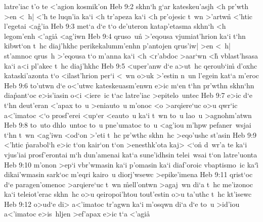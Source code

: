 latre'iac
t'o
te
<'agion
kosmik'on\bibvsend
\vs Heb 9:2
skhn`h
g`ar
kateskeu'asjh
<h
pr'wth
>en
<~h|
<'h
te
luqn'ia
ka`i
<h
tr'apeza
ka`i
<h
pr'ojesic
t~wn
>'artw\r{n}
<'htic
l'egetai
<a\r{g}'ia\bibvsend
{}
\vs Heb 9:3
met`a
d`e
t`o
de'uteron
katap'etasma
skhn`h
<h
legom'enh
<'agia\r{}
<ag'iwn\bibvsend
\vs Heb 9:4
qruso~un\r{}
>'eqousa
vjumiat'hrion
ka`i
t`hn
kibwt`on
t~hc
diaj'hkhc
perikekalumm'enhn
p'antojen
qrus'iw|
>en
<~h|
st'amnoc
qrus~h
>'eqousa
t`o
m'anna
ka`i
<h
<r'abdoc
>aar`wn
<h\r{}
vblast'hsasa
ka`i
a<i
pl'akec
t~hc
diaj'hkhc\bibvsend
\vs Heb 9:5
<uper'anw
d`e
a>ut~hc
qeroub`i\r{m}
d'oxhc
kataski'azonta
t`o
<ilast'hrion
per`i
<~wn
o>uk
>'estin
n~un
l'egein
kat`a
m'eroc\bibvsend
\vs Heb 9:6
to'utwn
d`e
o<'utwc
kateskeuasm'enwn
e>ic
m`en
t`hn
pr'wthn
skhn`hn
dia\r{p}ant`oc
e>is'iasin
o<i
<iere~ic
t`ac
latre'iac
>epitelo~untec\bibvsend
\vs Heb 9:7
e>ic
d`e
t`hn
deut'eran
<'apax
to~u
>eniauto~u
m'onoc
<o
>arqiere`uc
o>u
qwr`ic
a<'imatoc
<`o
prosf'erei
<up`er
<eauto~u
ka`i
t~wn
to~u
lao~u
>agnohm'atwn\bibvsend
\vs Heb 9:8
to~uto
dhlo~untoc
to~u
pne'umatoc
to~u
<ag'iou
m'hpw
pefaner~wsjai
t`hn
t~wn
<ag'iwn
<od`on
>'eti
t~hc
pr'wthc
skhn~hc
>eqo'ushc
st'asin\bibvsend
\vs Heb 9:9
<'htic
\r{p}arabol`h
e>ic
t`on
kair`on
t`on
>enesthk'ota
kaj>
<`o\r{n}
d~wr'a
te
ka`i
vjus'iai
prosf'erontai
m`h
dun'amenai
kat`a
sune'idhsin
telei~wsai
t`on
latre'uonta\bibvsend
\vs Heb 9:10
m'onon
>ep`i
vbr'wmasin
ka`i
p'omasin
ka`i
diaf'oroic
vbaptismo~ic
ka`i\r{}
dikai'wmasin
sark`oc
m'eqri
kairo~u
diorj'wsewc
>epike'imena\bibvsend
\vs Heb 9:11
qrist`oc
d`e
paragen'omenoc
>arqiere`uc
t~wn
\r{m}ell'ontwn
>agaj~wn
di`a
t~hc
me'izonoc
ka`i
teleiot'erac
skhn~hc
o>u
qeiropoi'htou
tou\r{t}'estin
o>u
ta'uthc
t~hc
kt'isewc\bibvsend
\vs Heb 9:12
o>ud`e
di>
a<'imatoc
tr'agwn
ka`i
m'osqwn
di`a
d`e
to~u
>id'iou
a<'imatoc
e>is~hljen
>ef'apax
e>ic
t`a
<'agi\r{a}
